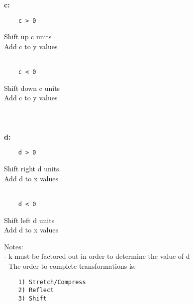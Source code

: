 \documentclass{article}
\begin{document}
    \begin{multicols}{2}
    \noindent \\\\
    \textbf{c:}
    \begin{verbatim}
    c > 0
    \end{verbatim}
    \noindent
    Shift up c units\\
    Add c to y values\\\\
    \begin{verbatim}
    c < 0
    \end{verbatim}
    \noindent
    Shift down c units\\
    Add c to y values\\\\

    \columnbreak
    \noindent  \\\\
    \textbf{d:}
    \begin{verbatim}
    d > 0
    \end{verbatim}
    \noindent
    Shift right d units\\
    Add d to x values\\\\
    \begin{verbatim}
    d < 0
    \end{verbatim}
    \noindent
    Shift left d units\\
    Add d to x values \\

    \end{multicols}

    \noindent
    \newpage
    Notes:\\
    - k must be factored out in order to determine the value of d\\
    - The order to complete transformations is:
    \begin{verbatim}
    1) Stretch/Compress
    2) Reflect
    3) Shift
    \end{verbatim}

\end{document}
